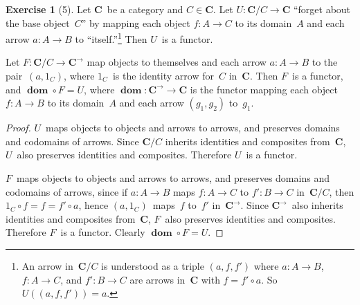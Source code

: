 \documentclass[letterpaper,12pt]{article}
\newcommand{\after}{\circ}
\DeclareMathOperator{\fdom}{\mathbf{dom}}
\newcommand{\cat}[1]{\mathbf{#1}}
\newcommand{\arr}[1]{#1^{\rightarrow}}
\newcommand{\2}{\cat{2}}
\newcommand{\C}{\cat{C}}
\theoremstyle{definition}
\newtheorem*{exer}{Exercise}
\theoremstyle{remark}
\theoremstyle{direction}
\begin{document}
\begin{exer}[5]
Let \(\C\)~be a category and \(C\in\C\). Let \(U:\C/C\to\C\) ``forget about the base object~\(C\)'' by mapping each object \(f:A\to C\) to its domain~\(A\) and each arrow \(a:A\to B\) to ``itself.''\footnote{An arrow in~\(\C/C\) is understood as a triple \((a,f,f')\) where \(a:A\to B\), \(f:A\to C\), and \(f':B\to C\) are arrows in~\(\C\) with \(f=f'\after a\). So \(U((a,f,f'))=a\).} Then \(U\)~is a functor.

Let \(F:\C/C\to\arr{\C}\) map objects to themselves and each arrow \(a:A\to B\) to the pair~\((a,1_C)\), where \(1_C\)~is the identity arrow for~\(C\) in~\(\C\). Then \(F\)~is a functor, and \(\fdom\after F=U\), where \(\fdom:\arr{\C}\to\C\) is the functor mapping each object \(f:A\to B\) to its domain~\(A\) and each arrow \((g_1,g_2)\) to~\(g_1\).
\end{exer}
\begin{proof}
\(U\)~maps objects to objects and arrows to arrows, and preserves domains and codomains of arrows. Since \(\C/C\) inherits identities and composites from~\(\C\), \(U\)~also preserves identities and composites. Therefore \(U\)~is a functor.

\(F\)~maps objects to objects and arrows to arrows, and preserves domains and codomains of arrows, since if \(a:A\to B\) maps \(f:A\to C\) to \(f':B\to C\) in~\(\C/C\), then \(1_C\after f=f=f'\after a\), hence \((a,1_C)\)~maps~\(f\) to~\(f'\) in~\(\arr{\C}\). Since \(\arr{\C}\)~also inherits identities and composites from~\(\C\), \(F\)~also preserves identities and composites. Therefore \(F\)~is a functor. Clearly \(\fdom\after F=U\).
\end{proof}
\end{document}

